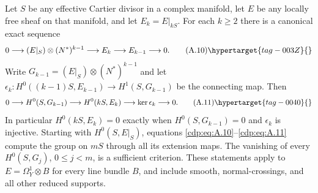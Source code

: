 \begin{proposition}\hypertarget{tag-01AL}{}\label{cdp:st:A.3.1}


Let $S$ be any effective Cartier divisor in a complex manifold, let $E$ be any locally free sheaf on that manifold, and let $E_k=E|_{kS}$. For each $k\ge2$ there is a canonical exact sequence
\[
0\longrightarrow (E|_S)\otimes(N^*)^{k-1}
 \longrightarrow E_k\longrightarrow E_{k-1}\longrightarrow0.
\tag{A.10}\hypertarget{tag-003Z}{}\label{cdp:eq:A.10}
\]
Write $G_{k-1}=(E|_S)\otimes(N^*)^{k-1}$ and let
$\epsilon_k:H^0((k-1)S,E_{k-1})\to H^1(S,G_{k-1})$
be the connecting map. Then
\[
0\longrightarrow H^0(S,G_{k-1})\longrightarrow H^0(kS,E_k)
 \longrightarrow\ker\epsilon_k\longrightarrow0.
\tag{A.11}\hypertarget{tag-0040}{}\label{cdp:eq:A.11}
\]
In particular $H^0(kS,E_k)=0$ exactly when $H^0(S,G_{k-1})=0$ and $\epsilon_k$ is injective. Starting with $H^0(S,E|_S)$, equations \eqref{cdp:eq:A.10}--\eqref{cdp:eq:A.11} compute the group on $mS$ through all its extension maps. The vanishing of every $H^0(S,G_j)$, $0\le j<m$, is a sufficient criterion. These statements apply to $E=\Omega_Y^1\otimes B$ for every line bundle $B$, and include smooth, normal-crossings, and all other reduced supports.
\end{proposition}

